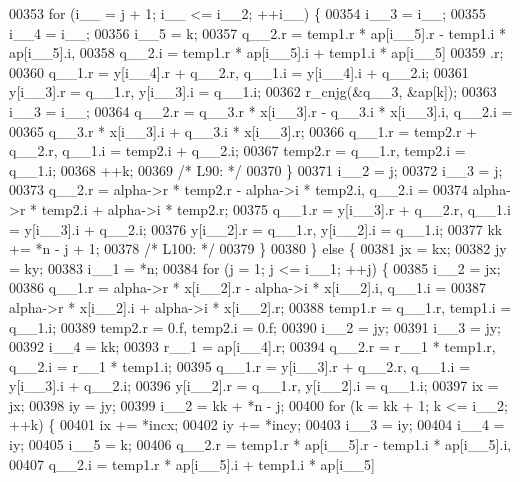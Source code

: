 \begin{DoxyCode}
00353         \textcolor{keywordflow}{for} (i\_\_ = j + 1; i\_\_ <= i\_\_2; ++i\_\_) \{
00354             i\_\_3 = i\_\_;
00355             i\_\_4 = i\_\_;
00356             i\_\_5 = k;
00357             q\_\_2.r = temp1.r * ap[i\_\_5].r - temp1.i * ap[i\_\_5].i, 
00358                 q\_\_2.i = temp1.r * ap[i\_\_5].i + temp1.i * ap[i\_\_5]
00359                 .r;
00360             q\_\_1.r = y[i\_\_4].r + q\_\_2.r, q\_\_1.i = y[i\_\_4].i + q\_\_2.i;
00361             y[i\_\_3].r = q\_\_1.r, y[i\_\_3].i = q\_\_1.i;
00362             r\_cnjg(&q\_\_3, &ap[k]);
00363             i\_\_3 = i\_\_;
00364             q\_\_2.r = q\_\_3.r * x[i\_\_3].r - q\_\_3.i * x[i\_\_3].i, q\_\_2.i =
00365                  q\_\_3.r * x[i\_\_3].i + q\_\_3.i * x[i\_\_3].r;
00366             q\_\_1.r = temp2.r + q\_\_2.r, q\_\_1.i = temp2.i + q\_\_2.i;
00367             temp2.r = q\_\_1.r, temp2.i = q\_\_1.i;
00368             ++k;
00369 \textcolor{comment}{/* L90: */}
00370         \}
00371         i\_\_2 = j;
00372         i\_\_3 = j;
00373         q\_\_2.r = alpha->r * temp2.r - alpha->i * temp2.i, q\_\_2.i = 
00374             alpha->r * temp2.i + alpha->i * temp2.r;
00375         q\_\_1.r = y[i\_\_3].r + q\_\_2.r, q\_\_1.i = y[i\_\_3].i + q\_\_2.i;
00376         y[i\_\_2].r = q\_\_1.r, y[i\_\_2].i = q\_\_1.i;
00377         kk += *n - j + 1;
00378 \textcolor{comment}{/* L100: */}
00379         \}
00380     \} \textcolor{keywordflow}{else} \{
00381         jx = kx;
00382         jy = ky;
00383         i\_\_1 = *n;
00384         \textcolor{keywordflow}{for} (j = 1; j <= i\_\_1; ++j) \{
00385         i\_\_2 = jx;
00386         q\_\_1.r = alpha->r * x[i\_\_2].r - alpha->i * x[i\_\_2].i, q\_\_1.i =
00387              alpha->r * x[i\_\_2].i + alpha->i * x[i\_\_2].r;
00388         temp1.r = q\_\_1.r, temp1.i = q\_\_1.i;
00389         temp2.r = 0.f, temp2.i = 0.f;
00390         i\_\_2 = jy;
00391         i\_\_3 = jy;
00392         i\_\_4 = kk;
00393         r\_\_1 = ap[i\_\_4].r;
00394         q\_\_2.r = r\_\_1 * temp1.r, q\_\_2.i = r\_\_1 * temp1.i;
00395         q\_\_1.r = y[i\_\_3].r + q\_\_2.r, q\_\_1.i = y[i\_\_3].i + q\_\_2.i;
00396         y[i\_\_2].r = q\_\_1.r, y[i\_\_2].i = q\_\_1.i;
00397         ix = jx;
00398         iy = jy;
00399         i\_\_2 = kk + *n - j;
00400         \textcolor{keywordflow}{for} (k = kk + 1; k <= i\_\_2; ++k) \{
00401             ix += *incx;
00402             iy += *incy;
00403             i\_\_3 = iy;
00404             i\_\_4 = iy;
00405             i\_\_5 = k;
00406             q\_\_2.r = temp1.r * ap[i\_\_5].r - temp1.i * ap[i\_\_5].i, 
00407                 q\_\_2.i = temp1.r * ap[i\_\_5].i + temp1.i * ap[i\_\_5]

\end{DoxyCode}
